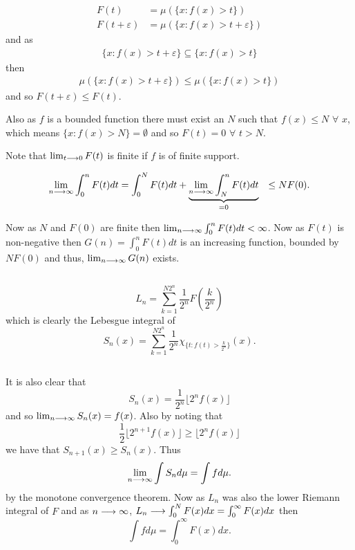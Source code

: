 \documentclass{unswmaths}
\begin{document}
\section{}

\subsection{}
\begin{align*}
    F(t) &= \mu\left( \{ x : f(x) > t \} \right) \\
    F(t+\varepsilon) &= \mu\left( \{ x : f(x) > t + \varepsilon \} \right)
\end{align*}
and as
\begin{align*}
    \{ x : f(x) > t + \varepsilon \} \subseteq \{ x : f(x) > t \}
\end{align*}
then
\begin{align*}
  \mu\left( \{ x : f(x) > t + \varepsilon \} \right) \leq \mu\left( \{ x : f(x) > t \} \right)
\end{align*}
and so $ F(t+\varepsilon) \leq F(t) $.

Also as $ f $ is a bounded function there must exist an $ N $ such that $ f(x) \leq N $ $ \forall $ $ x $, which means
$ \{ x : f(x) > N  \} = \emptyset $ and so $ F(t) = 0 $ $ \forall $ $ t > N $.

Note that $ \lim_{t \longrightarrow 0} F(t) $ is finite if $ f $ is of finite support.

\begin{align*}
    \lim_{n \longrightarrow \infty} \int_0^n F(t)dt &= \int_0^N F(t) dt + \underbrace{\lim_{n \longrightarrow \infty} \int_N^n F(t) dt}_{=0} 
	&\leq N F(0).
\end{align*}

Now as $ N $ and $ F(0) $ are finite then $ \lim_{n \longrightarrow \infty} \int_0^n F(t)dt < \infty $. 
Now as $ F(t) $ is non-negative then $ G(n) = \int_0^n F(t) dt $ is an increasing function, bounded by $ NF(0) $ and thus,
$ \lim_{n \longrightarrow \infty} G(n) $ exists.

\subsection{}
$$
    L_n = \sum_{k = 1}^{N2^n} \frac{1}{2^n} F(\frac{k}{2^n})
$$
which is clearly the Lebesgue integral of
$$
    S_n(x) = \sum_{k=1}^{N2^n} \frac{1}{2^n} \chi_{\{ t : f(t) > \frac{k}{2^n} \}}(x).
$$
\subsection{}
It is also clear that
$$
    S_n(x) = \frac{1}{2^n} \lfloor 2^nf(x) \rfloor
$$
and so $ \lim_{n \longrightarrow \infty} S_n(x) = f(x) $. Also by noting that 
$$
    \frac{1}{2} \lfloor 2^{n+1} f(x) \rfloor \geq \lfloor 2^n f(x) \rfloor 
$$
we have that $ S_{n+1}(x) \geq S_n(x) $.
Thus 
$$
    \lim_{n \longrightarrow \infty} \int S_n d\mu = \int f d\mu.
$$
by the monotone convergence theorem.
Now as $L_n$ was also the lower Riemann integral of $F$ and as $ n \longrightarrow \infty $, $ L_n \longrightarrow \int_0^N F(x) dx = \int_0^\infty F(x) dx $ then 
$$
    \int f d\mu = \int_0^\infty F(x) dx.
$$
\end{document}
